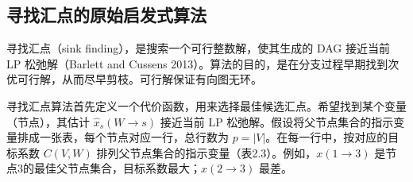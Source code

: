 \subsection{寻找汇点的原始启发式算法}

寻找汇点（sink finding），是搜索一个可行整数解，使其生成的 DAG 接近当前 LP 松弛解（Barlett and Cussens 2013）。算法的目的，是在分支过程早期找到次优可行解，从而尽早剪枝。可行解保证有向图无环。

寻找汇点算法首先定义一个代价函数，用来选择最佳候选汇点。希望找到某个变量（节点），其估计 $\widehat x_s(W\to s)$ 接近当前 LP 松弛解。假设将父节点集合的指示变量排成一张表，每个节点对应一行，总行数为 $p=|V|$。在每一行中，按对应的目标系数 $C(V,W)$ 排列父节点集合的指示变量（表2.3）。例如，$x(1\to3)$ 是节点3的最佳父节点集合，目标系数最大；$x(2\to3)$ 最差。

